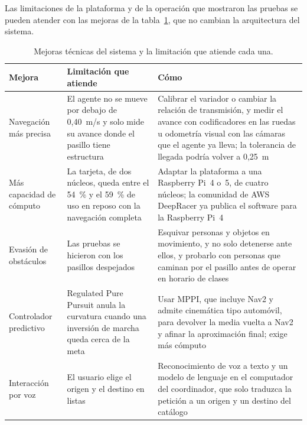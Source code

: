 %

Las limitaciones de la plataforma y de la operación que mostraron las pruebas se
pueden atender con las mejoras de la tabla~\ref{tab:mejoras}, que no cambian la
arquitectura del sistema.

\begin{table}[H]
  \centering\footnotesize{}
  \caption{Mejoras técnicas del sistema y la limitación que atiende cada una.}
  \label{tab:mejoras}
  \begin{tabular}{@{}>{\raggedright\arraybackslash}p{}>{\raggedright\arraybackslash}p{}>{\raggedright\arraybackslash}p{}@{}}
    \toprule
    \textbf{Mejora} & \textbf{Limitación que atiende} & \textbf{Cómo} \\ \midrule
    Navegación más precisa & El agente no se mueve por debajo de 0,40~m/s y solo mide su avance donde el pasillo tiene estructura & Calibrar el variador o cambiar la relación de transmisión, y medir el avance con codificadores en las ruedas u odometría visual con las cámaras que el agente ya lleva; la tolerancia de llegada podría volver a 0,25~m \\ \addlinespace
    Más capacidad de cómputo & La tarjeta, de dos núcleos, queda entre el 54~\% y el 59~\% de uso en reposo con la navegación completa & Adaptar la plataforma a una Raspberry Pi~4 o~5, de cuatro núcleos; la comunidad de AWS DeepRacer ya publica el software para la Raspberry Pi~4 \\ \addlinespace
    Evasión de obstáculos & Las pruebas se hicieron con los pasillos despejados & Esquivar personas y objetos en movimiento, y no solo detenerse ante ellos, y probarlo con personas que caminan por el pasillo antes de operar en horario de clases \\ \addlinespace
    Controlador predictivo & Regulated Pure Pursuit anula la curvatura cuando una inversión de marcha queda cerca de la meta & Usar MPPI, que incluye Nav2 y admite cinemática tipo automóvil, para devolver la media vuelta a Nav2 y afinar la aproximación final; exige más cómputo \\ \addlinespace
    Interacción por voz & El usuario elige el origen y el destino en listas & Reconocimiento de voz a texto y un modelo de lenguaje en el computador del coordinador, que solo traduzca la petición a un origen y un destino del catálogo \\ \bottomrule
  \end{tabular}
\end{table}

